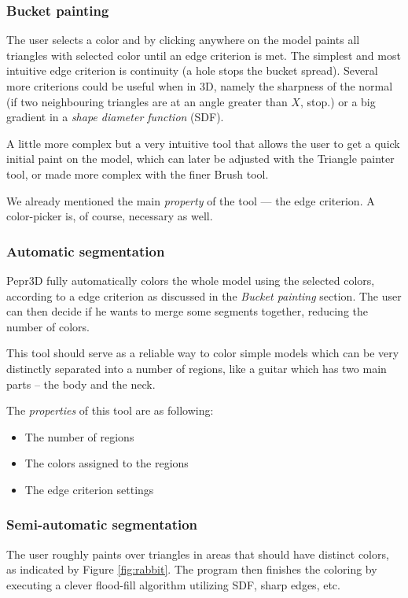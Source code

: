 \subsubsection{Bucket painting}
The user selects a color and by clicking anywhere on the model paints all triangles with selected color until an edge criterion is met. The simplest and most intuitive edge criterion is continuity (a hole stops the bucket spread). Several more criterions could be useful when in 3D, namely the sharpness of the normal (if two neighbouring triangles are at an angle greater than $X$, stop.) or a big gradient in a \textit{shape diameter function} (SDF).

A little more complex but a very intuitive tool that allows the user to get a quick initial paint on the model, which can later be adjusted with the Triangle painter tool, or made more complex with the finer Brush tool.

We already mentioned the main \textit{property} of the tool --- the edge criterion. A color-picker is, of course, necessary as well.

\subsubsection{Automatic segmentation}
Pepr3D fully automatically colors the whole model using the selected colors, according to a edge criterion as discussed in the \textit{Bucket painting} section. The user can then decide if he wants to merge some segments together, reducing the number of colors.

This tool should serve as a reliable way to color simple models which can be very distinctly separated into a number of regions, like a guitar which has two main parts -- the body and the neck.

The \textit{properties} of this tool are as following:
\begin{itemize}
\item The number of regions
\item The colors assigned to the regions
\item The edge criterion settings
\end{itemize}

\subsubsection{Semi-automatic segmentation}
The user roughly paints over triangles in areas that should have distinct colors, as indicated by Figure \ref{fig:rabbit}. The program then finishes the coloring by executing a clever flood-fill algorithm utilizing SDF, sharp edges, etc. 


